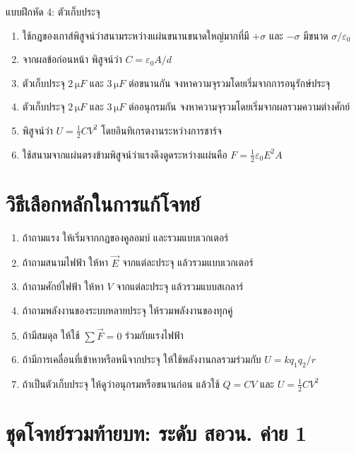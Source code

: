 \begin{exercisebox}{แบบฝึกหัด 4: ตัวเก็บประจุ}
\begin{enumerate}
    \item ใช้กฎของเกาส์พิสูจน์ว่าสนามระหว่างแผ่นขนานขนาดใหญ่มากที่มี $+\sigma$ และ $-\sigma$ มีขนาด $\sigma/\varepsilon_0$
    \item จากผลข้อก่อนหน้า พิสูจน์ว่า $C=\varepsilon_0A/d$
    \item ตัวเก็บประจุ $2\,\si{\micro F}$ และ $3\,\si{\micro F}$ ต่อขนานกัน จงหาความจุรวมโดยเริ่มจากการอนุรักษ์ประจุ
    \item ตัวเก็บประจุ $2\,\si{\micro F}$ และ $3\,\si{\micro F}$ ต่ออนุกรมกัน จงหาความจุรวมโดยเริ่มจากผลรวมความต่างศักย์
    \item พิสูจน์ว่า $U=\frac{1}{2}CV^2$ โดยอินทิเกรตงานระหว่างการชาร์จ
    \item ใช้สนามจากแผ่นตรงข้ามพิสูจน์ว่าแรงดึงดูดระหว่างแผ่นคือ $F=\frac{1}{2}\varepsilon_0E^2A$
\end{enumerate}
\end{exercisebox}

\section{วิธีเลือกหลักในการแก้โจทย์}

\begin{tcolorbox}[title=แผนแก้โจทย์ไฟฟ้าสถิต]
\begin{enumerate}
    \item ถ้าถามแรง ให้เริ่มจากกฎของคูลอมบ์ และรวมแบบเวกเตอร์
    \item ถ้าถามสนามไฟฟ้า ให้หา $\vec{E}$ จากแต่ละประจุ แล้วรวมแบบเวกเตอร์
    \item ถ้าถามศักย์ไฟฟ้า ให้หา $V$ จากแต่ละประจุ แล้วรวมแบบสเกลาร์
    \item ถ้าถามพลังงานของระบบหลายประจุ ให้รวมพลังงานของทุกคู่
    \item ถ้ามีสมดุล ให้ใช้ $\sum \vec{F}=0$ ร่วมกับแรงไฟฟ้า
    \item ถ้ามีการเคลื่อนที่เข้าหาหรือหนีจากประจุ ให้ใช้พลังงานกลรวมร่วมกับ $U=kq_1q_2/r$
    \item ถ้าเป็นตัวเก็บประจุ ให้ดูว่าอนุกรมหรือขนานก่อน แล้วใช้ $Q=CV$ และ $U=\frac{1}{2}CV^2$
\end{enumerate}
\end{tcolorbox}

\section{ชุดโจทย์รวมท้ายบท: ระดับ สอวน. ค่าย 1}

